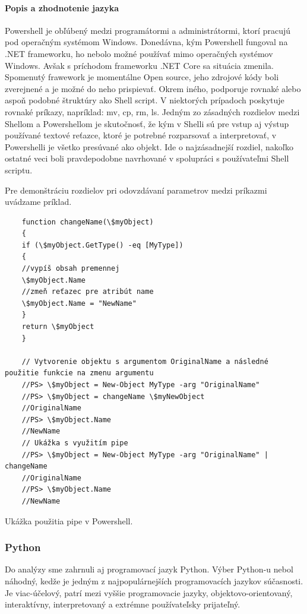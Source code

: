 \paragraph{Popis a zhodnotenie jazyka}
Powershell je obľúbený medzi programátormi a administrátormi, ktorí pracujú pod operačným systémom Windows. Donedávna, kým Powershell fungoval na .NET frameworku, ho nebolo možné používať mimo operačných systémov Windows. Avšak s príchodom frameworku .NET Core sa situácia zmenila. Spomenutý frawework je momentálne Open source, jeho zdrojové kódy boli zverejnené a je možné do neho prispievať. Okrem iného, podporuje rovnaké alebo aspoň podobné štruktúry ako Shell script. V niektorých prípadoch poskytuje rovnaké príkazy, napríklad: mv, cp, rm, ls. Jedným zo zásadných rozdielov medzi Shellom a Powershellom je skutočnosť, že kým v Shelli sú pre vstup aj výstup používané textové reťazce, ktoré je potrebné rozparsovať a interpretovať, v Powershelli je všetko presúvané ako objekt. Ide o najzásadnejší rozdiel, nakoľko ostatné veci boli pravdepodobne navrhované v spolupráci s používateľmi Shell scriptu. \cite{psbook}

Pre demonštráciu rozdielov pri odovzdávaní parametrov medzi príkazmi uvádzame príklad.
\newpage
\begin{algorithm}[H]
	\begin{verbatim}
	function changeName(\$myObject)
	{
	if (\$myObject.GetType() -eq [MyType])
	{
	//vypíš obsah premennej
	\$myObject.Name
	//zmeň reťazec pre atribút name
	\$myObject.Name = "NewName"
	}
	return \$myObject
	}
	
	// Vytvorenie objektu s argumentom OriginalName a následné použitie funkcie na zmenu argumentu
	//PS> \$myObject = New-Object MyType -arg "OriginalName"
	//PS> \$myObject = changeName \$myNewObject
	//OriginalName
	//PS> \$myObject.Name
	//NewName
	// Ukážka s využitím pipe
	//PS> \$myObject = New-Object MyType -arg "OriginalName" | changeName
	//OriginalName
	//PS> \$myObject.Name
	//NewName
	\end{verbatim}
	\caption{Ukážka použitia pipe v Powershell. \cite{netalg}}
	\label{alg:gen}
\end{algorithm}

\subsubsection{Python}
\indent Do analýzy sme zahrnuli aj programovací jazyk Python. Výber Python-u nebol náhodný, kedže je jedným z najpopulárnejších programovacích jazykov súčasnosti. Je viac-účelový, patrí mezi vyššie programovacie jazyky, objektovo-orientovaný, interaktívny, interpretovaný a extrémne používateľsky prijateľný.\cite{python}
